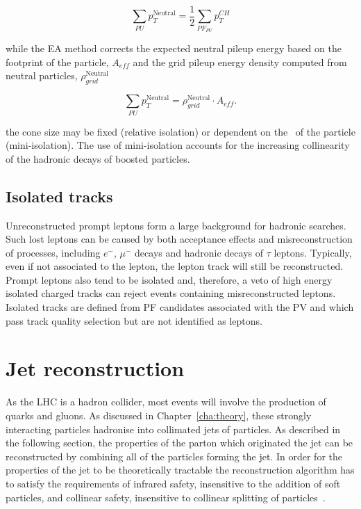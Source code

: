 \begin{equation}
\sum_{PU}p_T^{\text{Neutral}} = \frac{1}{2} \sum_{PF_{PU}}p_T^{CH}
\end{equation}

while the EA method corrects the expected neutral pileup energy based on the footprint of the particle, $A_{eff}$ and the grid pileup
energy density computed from neutral particles, $\rho_{grid}^{\text{Neutral}}$

\begin{equation}
\sum_{PU}p_T^{\text{Neutral}} = \rho_{grid}^{\text{Neutral}}\cdot A_{eff}.
\end{equation}

the cone size may be fixed (relative isolation) or dependent on the \pt~of the particle (mini-isolation). The use of mini-isolation
accounts for the increasing collinearity of the hadronic decays of boosted particles. 

\subsection{Isolated tracks}

Unreconstructed prompt leptons form a large background for hadronic searches.
Such lost leptons can be caused by both acceptance effects and misreconstruction of 
processes, including $e^{-}$, $\mu^{-}$ decays and hadronic decays of $\tau$ leptons. 
Typically, even if not associated to the lepton, the lepton track will still be
reconstructed. Prompt leptons also tend to be isolated and, therefore, a veto of high energy isolated 
charged tracks can reject events containing misreconstructed leptons.
Isolated tracks are defined from PF candidates associated with the PV and 
which pass track quality selection but are not identified as leptons.

\section{Jet reconstruction} 
\label{sec:jet_reco}
As the LHC is a hadron collider, most events will involve the production of quarks and gluons. As discussed in
Chapter~\ref{cha:theory}, these strongly interacting particles hadronise into collimated jets of particles. As described 
in the following section, the properties of the parton which originated the
jet can be reconstructed by combining all of the particles forming the jet. In order for the properties of the jet to be theoretically tractable the
reconstruction algorithm has to satisfy the requirements of infrared safety, insensitive to the addition of 
soft particles, and collinear safety, insensitive to collinear splitting of particles~\cite{salam}.

